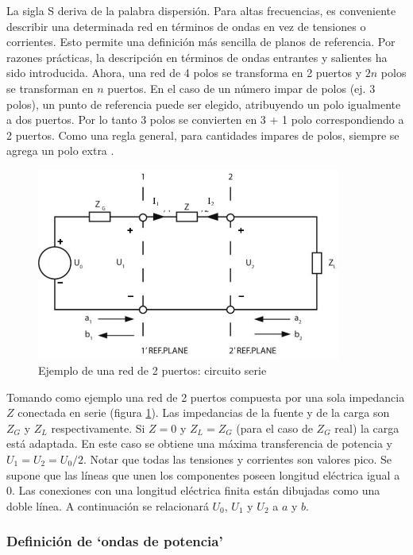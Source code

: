 La sigla S deriva de la palabra dispersión. Para altas frecuencias, es conveniente describir una
determinada red en términos de ondas en vez de tensiones o corrientes. Esto permite una definición más sencilla de planos
de referencia. Por razones prácticas, la descripción en términos de ondas entrantes y salientes ha sido introducida. Ahora,
una red de 4 polos se transforma en 2 puertos y $2n$ polos se transforman en $n$ puertos. En el caso de un número impar de polos
(ej. 3 polos), un punto de referencia puede ser elegido, atribuyendo un polo igualmente a dos puertos. Por lo tanto 3 polos se
convierten en 3 + 1 polo correspondiendo a 2 puertos. Como una regla general, para cantidades impares de polos, siempre se agrega
un polo extra \cite{Caspers}.

\begin{figure}[H]
 \centering
 \includegraphics[width=10cm]{gfx/sParameters1.png}
 \caption{Ejemplo de una red de 2 puertos: circuito serie \cite{Caspers}}
 \label{fig:esquema_serie}
\end{figure}

Tomando como ejemplo una red de 2 puertos compuesta por una sola impedancia $Z$ conectada en serie (figura \ref{fig:esquema_serie}).
Las impedancias de la fuente y de la carga son $Z_G$ y $Z_L$ respectivamente. Si $Z=0$ y $Z_L = Z_G$ (para el caso de $Z_G$ real)
la carga está adaptada. En este caso se obtiene una máxima transferencia de potencia y $U_1 = U_2 = U_0/2$. Notar que todas las
tensiones y corrientes son valores pico. Se supone que las líneas que unen los componentes poseen longitud eléctrica igual a 0.
Las conexiones con una longitud eléctrica finita están dibujadas como una doble línea. A continuación se relacionará $U_0$, $U_1$
y $U_2$ a $a$ y $b$.


\subsubsection{Definición de \enquote*{ondas de potencia}}

